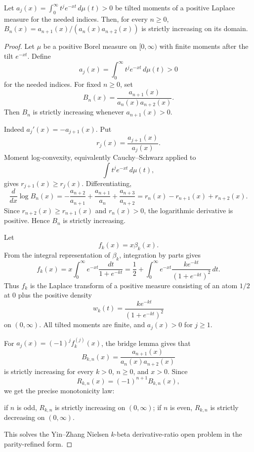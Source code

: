 \begin{proposition}
\label{res:cm-laplace-moment-ratio-monotonicity}
Let \(a_j(x)=\int_0^\infty t^j e^{-xt}\,d\mu(t)>0\) be tilted moments of a positive Laplace measure for the needed indices. Then, for every \(n\ge0\), \(B_n(x)=a_{n+1}(x)/(a_n(x)a_{n+2}(x))\) is strictly increasing on its domain.
\end{proposition}
\begin{proof}
Let \(\mu\) be a positive Borel measure on \([0,\infty)\) with finite moments after the tilt \(e^{-xt}\). Define
\[
a_j(x)=\int_0^\infty t^j e^{-xt}\,d\mu(t)>0
\]
for the needed indices. For fixed \(n\ge0\), set
\[
B_n(x)=\frac{a_{n+1}(x)}{a_n(x)a_{n+2}(x)}.
\]
Then \(B_n\) is strictly increasing whenever \(a_{n+1}(x)>0\).

Indeed \(a_j'(x)=-a_{j+1}(x)\). Put
\[
r_j(x)=\frac{a_{j+1}(x)}{a_j(x)}.
\]
Moment log-convexity, equivalently Cauchy--Schwarz applied to
\[
\int t^j e^{-xt}\,d\mu(t),
\]
gives \(r_{j+1}(x)\ge r_j(x)\). Differentiating,
\[
\frac{d}{dx}\log B_n(x)
=-\frac{a_{n+2}}{a_{n+1}}
+\frac{a_{n+1}}{a_n}
+\frac{a_{n+3}}{a_{n+2}}
=r_n(x)-r_{n+1}(x)+r_{n+2}(x).
\]
Since \(r_{n+2}(x)\ge r_{n+1}(x)\) and \(r_n(x)>0\), the logarithmic derivative is positive. Hence \(B_n\) is strictly increasing.

Let
\[
f_k(x)=x\beta_k(x).
\]
From the integral representation of \(\beta_k\), integration by parts gives
\[
f_k(x)
=x\int_0^\infty e^{-xt}\frac{dt}{1+e^{-kt}}
=\frac12+\int_0^\infty e^{-xt}\frac{k e^{-kt}}{(1+e^{-kt})^2}\,dt.
\]
Thus \(f_k\) is the Laplace transform of a positive measure consisting of an atom \(1/2\) at \(0\) plus the positive density
\[
w_k(t)=\frac{k e^{-kt}}{(1+e^{-kt})^2}
\]
on \((0,\infty)\). All tilted moments are finite, and \(a_{j}(x)>0\) for \(j\ge1\).

For \(a_j(x)=(-1)^j f_k^{(j)}(x)\), the bridge lemma gives that
\[
B_{k,n}(x)=\frac{a_{n+1}(x)}{a_n(x)a_{n+2}(x)}
\]
is strictly increasing for every \(k>0\), \(n\ge0\), and \(x>0\). Since
\[
R_{k,n}(x)=(-1)^{n+1}B_{k,n}(x),
\]
we get the precise monotonicity law:

if \(n\) is odd, \(R_{k,n}\) is strictly increasing on \((0,\infty)\);
if \(n\) is even, \(R_{k,n}\) is strictly decreasing on \((0,\infty)\).

This solves the Yin--Zhang Nielsen \(k\)-beta derivative-ratio open problem in the parity-refined form.
\end{proof}

